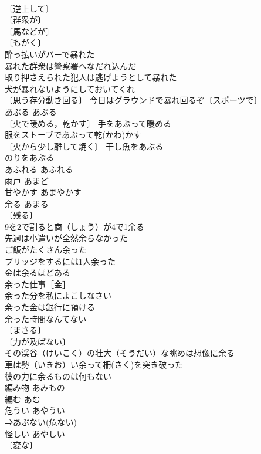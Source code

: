 \documentclass[8pt]{extreport}
\begin{document}
\begin{CJK}{UTF8}{min}
\\	〔逆上して〕
\\	〔群衆が〕
\\	〔馬などが〕
\\	〔もがく〕
\\	酔っ払いがバーで暴れた 
\\	暴れた群衆は警察署へなだれ込んだ 
\\	取り押さえられた犯人は逃げようとして暴れた 
\\	犬が暴れないようにしておいてくれ 
\\	〔思う存分動き回る〕 今日はグラウンドで暴れ回るぞ〔スポーツで〕 
\\	あぶる	あぶる	
\\	〔火で暖める，乾かす〕 手をあぶって暖める 
\\	服をストーブであぶって乾(かわ)かす 
\\	〔火から少し離して焼く〕 干し魚をあぶる 
\\	のりをあぶる 
\\	あふれる	あふれる	
\\	雨戸	あまど	
\\	甘やかす	あまやかす	
\\	余る	あまる	
\\	〔残る〕
\\	9を2で割ると商（しょう）が4で1余る 
\\	先週は小遣いが全然余らなかった 
\\	ご飯がたくさん余った 
\\	ブリッジをするには1人余った 
\\	金は余るほどある 
\\	余った仕事［金］ 
\\	余った分を私によこしなさい 
\\	余った金は銀行に預ける 
\\	余った時間なんてない 
\\	〔まさる〕
\\	〔力が及ばない〕
\\	その渓谷（けいこく）の壮大（そうだい）な眺めは想像に余る 
\\	車は勢（いきお）い余って柵(さく)を突き破った 
\\	彼の力に余るものは何もない 
\\	編み物	あみもの	
\\	編む	あむ	
\\	危うい	あやうい	
\\	⇒あぶない(危ない)
\\	怪しい	あやしい	
\\	〔変な〕

\end{CJK}
\end{document}
